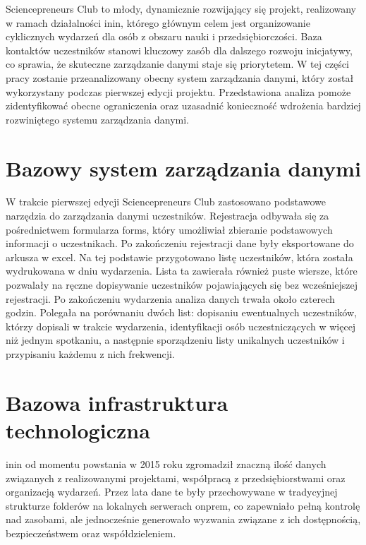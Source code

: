 Sciencepreneurs Club to młody, dynamicznie rozwijający się projekt, realizowany w ramach działalności \gls{inin}, którego głównym celem jest organizowanie cyklicznych wydarzeń dla osób z obszaru nauki i przedsiębiorczości. Baza kontaktów uczestników stanowi kluczowy zasób dla dalszego rozwoju inicjatywy, co sprawia, że skuteczne zarządzanie danymi staje się priorytetem. W tej części pracy zostanie przeanalizowany obecny system zarządzania danymi, który został wykorzystany podczas pierwszej edycji projektu. Przedstawiona analiza pomoże zidentyfikować obecne ograniczenia oraz uzasadnić konieczność wdrożenia bardziej rozwiniętego systemu zarządzania danymi.

\section{Bazowy system zarządzania danymi}

W trakcie pierwszej edycji Sciencepreneurs Club zastosowano podstawowe narzędzia do zarządzania danymi uczestników. Rejestracja odbywała się za pośrednictwem formularza \gls{forms}, który umożliwiał zbieranie podstawowych informacji o uczestnikach. Po zakończeniu rejestracji dane były eksportowane do arkusza w \gls{excel}. Na tej podstawie przygotowano listę uczestników, która została wydrukowana w dniu wydarzenia. Lista ta zawierała również puste wiersze, które pozwalały na ręczne dopisywanie uczestników pojawiających się bez wcześniejszej rejestracji. Po zakończeniu wydarzenia analiza danych trwała około czterech godzin. Polegała na porównaniu dwóch list: dopisaniu ewentualnych uczestników, którzy dopisali w trakcie wydarzenia, identyfikacji osób uczestniczących w więcej niż jednym spotkaniu, a następnie sporządzeniu listy unikalnych uczestników i przypisaniu każdemu z nich frekwencji.

\section{Bazowa infrastruktura technologiczna}

\gls{inin} od momentu powstania w 2015 roku \cite{RegulaminININ2015} zgromadził znaczną ilość danych związanych z realizowanymi projektami, współpracą z przedsiębiorstwami oraz organizacją wydarzeń. Przez lata dane te były przechowywane w tradycyjnej strukturze folderów na lokalnych serwerach \gls{onprem}, co zapewniało pełną kontrolę nad zasobami, ale jednocześnie generowało wyzwania związane z ich dostępnością, bezpieczeństwem oraz współdzieleniem.

